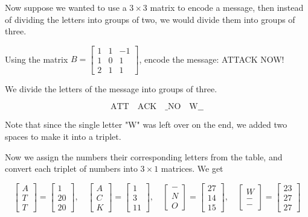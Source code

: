 Now suppose we wanted to use a \( 3 \times 3 \) matrix to encode a message, then instead of dividing the letters into groups of two, we would divide them into groups of three.

\begin{example}
    Using the matrix \( B = \begin{bmatrix} 1 & 1 & -1 \\ 1 & 0 & 1 \\ 2 & 1 & 1 \end{bmatrix} \), encode the message: ATTACK NOW!
\end{example}

\begin{solution}
    We divide the letters of the message into groups of three.

    \[
        \text{ATT} \quad \text{ACK} \quad \text{\_NO} \quad \text{W\_\_}
    \]

    Note that since the single letter "W" was left over on the end, we added two spaces to make it into a triplet.

    Now we assign the numbers their corresponding letters from the table, and convert each triplet of numbers into \( 3 \times 1 \) matrices. We get

    \[
        \begin{bmatrix} A \\ T \\ T \end{bmatrix} = \begin{bmatrix} 1 \\ 20 \\ 20 \end{bmatrix}, \quad
        \begin{bmatrix} A \\ C \\ K \end{bmatrix} = \begin{bmatrix} 1 \\ 3 \\ 11 \end{bmatrix}, \quad
        \begin{bmatrix} - \\ N \\ O \end{bmatrix} = \begin{bmatrix} 27 \\ 14 \\ 15 \end{bmatrix}, \quad
        \begin{bmatrix} W \\ - \\ - \end{bmatrix} = \begin{bmatrix} 23 \\ 27 \\ 27 \end{bmatrix}
    \]


\end{solution}
